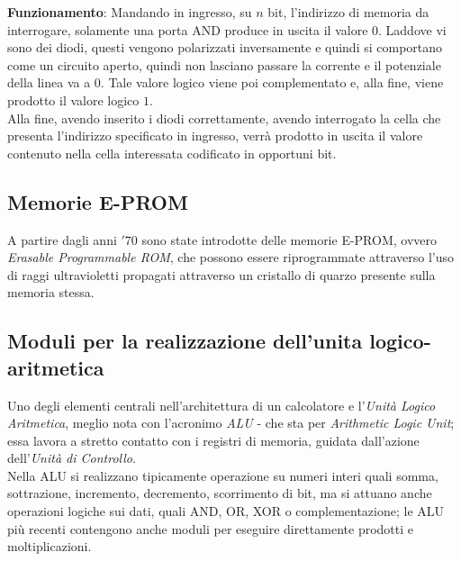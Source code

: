 \documentclass[a4paper]{extarticle}
\begin{document}
\vspace{1em}
\noindent
\textbf{Funzionamento}: Mandando in ingresso, su \(n\) bit, l'indirizzo di memoria da interrogare, solamente una porta AND produce in uscita il valore 0. Laddove vi sono dei diodi, questi vengono polarizzati inversamente e quindi si comportano come un circuito aperto, quindi non lasciano passare la corrente e il potenziale della linea va a \(0\). Tale valore logico viene poi complementato e, alla fine, viene prodotto il valore logico \(1\).\\
Alla fine, avendo inserito i diodi correttamente, avendo interrogato la cella che presenta l'indirizzo specificato in ingresso, verrà prodotto in uscita il valore contenuto nella cella interessata codificato in opportuni bit.

\subsection{Memorie E-PROM}
A partire dagli anni \('70\) sono state introdotte delle memorie E-PROM, ovvero \textit{Erasable Programmable ROM}, che possono essere riprogrammate attraverso l'uso di raggi ultravioletti propagati attraverso un cristallo di quarzo presente sulla memoria stessa.

\subsection{Moduli per la realizzazione dell’unita logico-aritmetica}
Uno degli elementi centrali nell’architettura di un calcolatore e l'\textit{Unità Logico Aritmetica}, meglio nota con l’acronimo \textit{ALU} - che sta per \textit{Arithmetic Logic Unit}; essa lavora a stretto contatto con i registri di memoria, guidata dall'azione dell'\textit{Unità di Controllo}.\\
Nella ALU si realizzano tipicamente operazione su numeri interi quali somma, sottrazione, incremento, decremento, scorrimento di bit, ma si attuano anche operazioni logiche sui dati, quali AND, OR, XOR o complementazione; le ALU più recenti contengono anche moduli per eseguire direttamente prodotti e moltiplicazioni.

\vspace{1em}
\noindent
\end{document}
